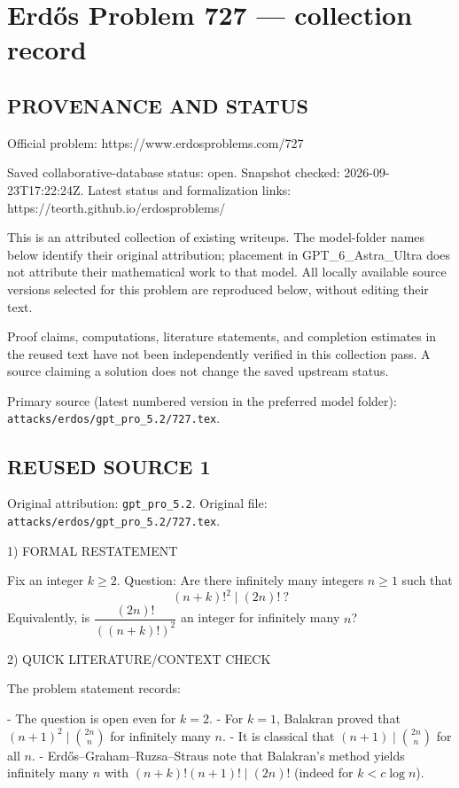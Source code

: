 \section*{Erd\H{o}s Problem 727 --- collection record}

\subsection*{PROVENANCE AND STATUS}
Official problem: https://www.erdosproblems.com/727

Saved collaborative-database status: open.
Snapshot checked: 2026-09-23T17:22:24Z.
Latest status and formalization links: https://teorth.github.io/erdosproblems/

This is an attributed collection of existing writeups. The model-folder names below identify their original attribution; placement in GPT\_6\_Astra\_Ultra does not attribute their mathematical work to that model. All locally available source versions selected for this problem are reproduced below, without editing their text.

Proof claims, computations, literature statements, and completion estimates in the reused text have not been independently verified in this collection pass. A source claiming a solution does not change the saved upstream status.

Primary source (latest numbered version in the preferred model folder): \texttt{attacks/erdos/gpt\_pro\_5.2/727.tex}.

\subsection*{REUSED SOURCE 1}
Original attribution: \texttt{gpt\_pro\_5.2}.
Original file: \texttt{attacks/erdos/gpt\_pro\_5.2/727.tex}.


1) FORMAL RESTATEMENT

Fix an integer $k\ge 2$.
Question: Are there infinitely many integers $n\ge 1$ such that
\[
(n+k)!^2 \mid (2n)!\ ?
\]
Equivalently, is $\dfrac{(2n)!}{((n+k)!)^2}$ an integer for infinitely many $n$?

2) QUICK LITERATURE/CONTEXT CHECK

The problem statement records:

- The question is open even for $k=2$.
- For $k=1$, Balakran proved that $(n+1)^2\mid \binom{2n}{n}$ for infinitely many $n$.
- It is classical that $(n+1)\mid \binom{2n}{n}$ for all $n$.
- Erd\H{o}s--Graham--Ruzsa--Straus note that Balakran's method yields infinitely many $n$ with $(n+k)!(n+1)!\mid (2n)!$ (indeed for $k<c\log n$).

